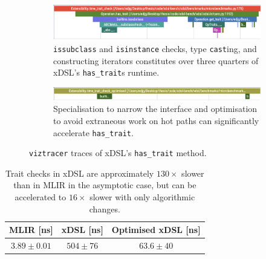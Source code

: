 
\begin{figure}[H]
    \centering
    \begin{subfigure}[b]{\textwidth}
        \centering
        \includegraphics[width=\textwidth]{images/specialising_optimising_xdsl_rewriting/original_hastrait.png}
        \captionsetup{width=0.8\textwidth}
        \caption{\texttt{issubclass} and \texttt{isinstance} checks, type \texttt{cast}ing, and constructing iterators constitutes over three quarters of xDSL's \texttt{has_trait}s runtime.}
        \label{fig:ubenchmark-hastrait-original-viztracer}
    \end{subfigure}
    \begin{subfigure}[b]{\textwidth}
        \centering
        \includegraphics[width=\textwidth]{images/specialising_optimising_xdsl_rewriting/optimised_hastrait.png}
        \captionsetup{width=0.8\textwidth}
        \caption{Specialisation to narrow the interface and optimisation to avoid extraneous work on hot paths can significantly accelerate \texttt{has_trait}.}
        \label{fig:ubenchmark-hastrait-optimised-viztracer}
    \end{subfigure}
    \caption{\texttt{viztracer} traces of xDSL's \texttt{has_trait} method.}
    \label{fig:ubenchmark-hastrait-viztracer}
\end{figure}


\begin{table}[H]
  \caption{Trait checks in xDSL are approximately $130\times$ slower than in MLIR in the asymptotic case, but can be accelerated to $16\times$ slower with only algorithmic changes.} %
  \label{tab:ubenchmark-trait-checks-optimised}
  \centering
  \begin{tabular}{ccc}
    \toprule
    \textbf{MLIR [ns]} & \textbf{xDSL [ns]} & \textbf{Optimised xDSL [ns]} \\
    \midrule
    $3.89 \pm 0.01$ & $504 \pm 76$ & $63.6 \pm 40$\\
    \bottomrule
  \end{tabular}
\end{table}




